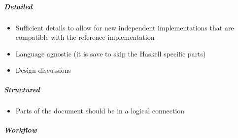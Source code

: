 \documentclass{report}
\theoremstyle{definition}{
  \newtheorem{lemma}{Lemma}[section] %
  \newtheorem{definition}[lemma]{Definition}
}
\theoremstyle{theorem}{
  \newtheorem{invariant}[lemma]{Invariant}
  \newtheorem{proofobligation}[lemma]{Proof Obligation}
}
\numberwithin{equation}{lemma}
\begin{document}
\subparagraph{Detailed}
\begin{itemize}
\item Sufficient details to allow for new independent implementations that are compatible with
the reference implementation
\item Language agnostic (it is save to skip the Haskell specific parts)
\item Design discussions
\end{itemize}
\subparagraph{Structured}
\begin{itemize}
\item Parts of the document should be in a logical connection
\end{itemize}
\subparagraph{Workflow}




\appendix
\end{document}
